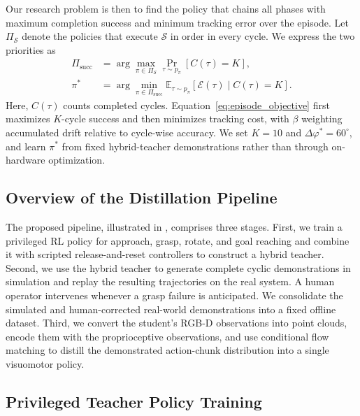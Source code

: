 Our research problem is then to find the policy that chains all phases with
maximum completion success and minimum tracking error over the episode. Let
$\Pi_{\mathcal S}$ denote the policies that execute $\mathcal S$ in order in
every cycle. We express the two priorities as
\begin{equation}
  \begin{aligned}
  \Pi_{\mathrm{succ}}
    &=\arg\max_{\pi\in\Pi_{\mathcal S}}
      \Pr_{\tau\sim p_\pi}\!\left[C(\tau)=K\right],\\
  \pi^*
    &=\arg\min_{\pi\in\Pi_{\mathrm{succ}}}
      \mathbb E_{\tau\sim p_\pi}\!\left[
        \mathcal E(\tau)\mid C(\tau)=K\right].
  \end{aligned}
  \label{eq:episode_objective}
\end{equation}
Here, $C(\tau)$ counts completed cycles. Equation~\eqref{eq:episode_objective}
first maximizes $K$-cycle success and then minimizes tracking cost, with
$\beta$ weighting accumulated drift relative to cycle-wise accuracy. We set
$K=10$ and $\Delta\varphi^*=60^\circ$, and learn $\pi^*$ from fixed
hybrid-teacher demonstrations rather than through on-hardware optimization.

\subsection{Overview of the Distillation Pipeline}

The proposed pipeline, illustrated in , comprises
three stages. First, we train a privileged RL policy for approach, grasp,
rotate, and goal reaching and combine it with scripted release-and-reset
controllers to construct a hybrid teacher. Second, we use the hybrid
teacher to generate complete cyclic demonstrations in simulation and replay
the resulting trajectories on the real system. A human operator intervenes
whenever a grasp failure is anticipated. We consolidate the simulated and
human-corrected real-world demonstrations into a fixed offline dataset. Third,
we convert the student's RGB-D observations into point clouds, encode them
with the proprioceptive observations, and use
conditional flow matching to distill the demonstrated action-chunk
distribution into a single visuomotor policy.

\subsection{Privileged Teacher Policy Training}

